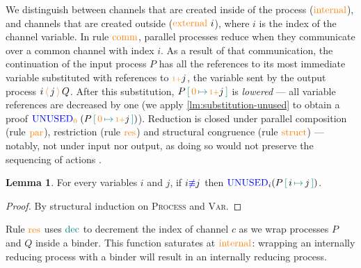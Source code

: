 \documentclass[sigplan,10pt,anonymous,review]{acmart}
\theoremstyle{definition}
\newtheorem{nilemma}{Lemma}
\newcommand{\type}[1]{\textcolor{blue}{\operatorname{#1}}}
\newcommand{\constr}[1]{\textcolor{orange}{\operatorname{#1}}}
\newcommand{\func}[1]{\textcolor{teal}{\operatorname{#1}}}
\newcommand{\send}[2]{#1 \, \constr{\langle} \, #2 \,\constr{\rangle} \,}
\newcommand{\suc}{\constr{\scriptstyle 1+}}
\newcommand{\subst}[3]{#1 \, \func{[} \, #3 \, \func{\mapsto} \,#2 \, \func{]}}
\newcommand{\Unused}{\type{UNUSED}}
\begin{document}
We distinguish between channels that are created inside of the process ($\constr{internal}$), and channels that are created outside ($\constr{external}\ i$), where $i$ is the index of the channel variable.
In rule $\constr{comm}$, parallel processes reduce when they communicate over a common channel with index ${i}$.
As a result of that communication, the continuation of the input process $P$ has all the references to its most immediate variable substituted with references to $\suc j$, the variable sent by the output process $\send{i}{j}{Q}$.
After this substitution, $\subst{P}{\suc j}{\constr{0}}$ is \emph{lowered} --- all variable references are decreased by one (we apply \autoref{lm:substitution-unused} to obtain a proof $\Unused_{\constr{0}} \; (\subst{P}{\suc j}{\constr{0}})$).
Reduction is closed under parallel composition (rule $\constr{par}$), restriction (rule $\constr{res}$) and structural congruence (rule $\constr{struct}$) 
--- notably, not under input nor output, as doing so would not preserve the sequencing of actions \cite{Sangio01}.

\begin{nilemma}
  \label{lm:substitution-unused}
  For every variables $i$ and $j$, if $i \type{\not\equiv} j$ then $\Unused_i \allowbreak (\subst{P}{j}{i})$.
\end{nilemma}
\begin{proof}
  By structural induction on \textsc{Process} and \textsc{Var}.
\end{proof}

Rule $\constr{res}$ uses $\func{dec}$ to decrement the index of channel $c$ as we wrap processes $P$ and $Q$ inside a binder.
This function saturates at $\constr{internal}$: wrapping an internally reducing process with a binder will result in an internally reducing process.
\end{document}
